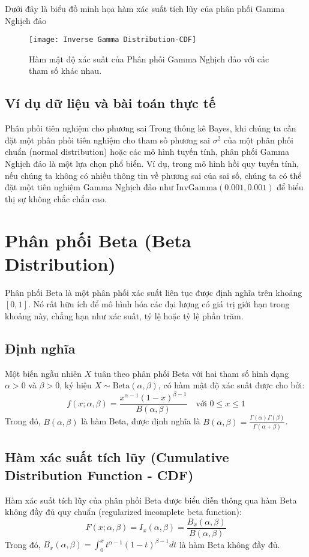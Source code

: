 	Dưới đây là biểu đồ minh họa hàm xác suất tích lũy của phân phối Gamma Nghịch đảo
	
		\begin{figure}[h!]
		\centering
		\texttt{[image: Inverse Gamma Distribution-CDF]} %
		\caption{Hàm mật độ xác suất của Phân phối Gamma Nghịch đảo với các tham số khác nhau.}
		\label{fig:Inverse Gamma Distribution-CDF}
	\end{figure}
	
	\subsection{Ví dụ dữ liệu và bài toán thực tế}
		Phân phối tiên nghiệm cho phương sai
		Trong thống kê Bayes, khi chúng ta cần đặt một phân phối tiên nghiệm cho tham số phương sai $\sigma^2$ của một phân phối chuẩn (normal distribution) hoặc các mô hình tuyến tính, phân phối Gamma Nghịch đảo là một lựa chọn phổ biến. Ví dụ, trong mô hình hồi quy tuyến tính, nếu chúng ta không có nhiều thông tin về phương sai của sai số, chúng ta có thể đặt một tiên nghiệm Gamma Nghịch đảo như $\text{InvGamma}(0.001, 0.001)$ để biểu thị sự không chắc chắn cao.
	
\section{Phân phối Beta (Beta Distribution)}
	Phân phối Beta là một phân phối xác suất liên tục được định nghĩa trên khoảng $[0, 1]$. Nó rất hữu ích để mô hình hóa các đại lượng có giá trị giới hạn trong khoảng này, chẳng hạn như xác suất, tỷ lệ hoặc tỷ lệ phần trăm.
	
	
	\subsection{Định nghĩa}
		Một biến ngẫu nhiên $X$ tuân theo phân phối Beta với hai tham số hình dạng $\alpha > 0$ và $\beta > 0$, ký hiệu $X \sim \text{Beta}(\alpha, \beta)$, có hàm mật độ xác suất được cho bởi:
		\[ f(x; \alpha, \beta) = \frac{x^{\alpha-1}(1-x)^{\beta-1}}{B(\alpha, \beta)} \quad \text{với } 0 \le x \le 1 \]
		Trong đó, $B(\alpha, \beta)$ là hàm Beta, được định nghĩa là $B(\alpha, \beta) = \frac{\Gamma(\alpha)\Gamma(\beta)}{\Gamma(\alpha+\beta)}$.
	
	\subsection{Hàm xác suất tích lũy (Cumulative Distribution Function - CDF)}
	Hàm xác suất tích lũy của phân phối Beta được biểu diễn thông qua hàm Beta không đầy đủ quy chuẩn (regularized incomplete beta function):
	\[ F(x; \alpha, \beta) = I_x(\alpha, \beta) = \frac{B_x(\alpha, \beta)}{B(\alpha, \beta)} \]
	Trong đó, $B_x(\alpha, \beta) = \int_0^x t^{\alpha-1}(1-t)^{\beta-1} dt$ là hàm Beta không đầy đủ.
	
